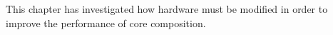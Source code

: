 This chapter has investigated how hardware must be modified in order to improve the performance of core composition.
